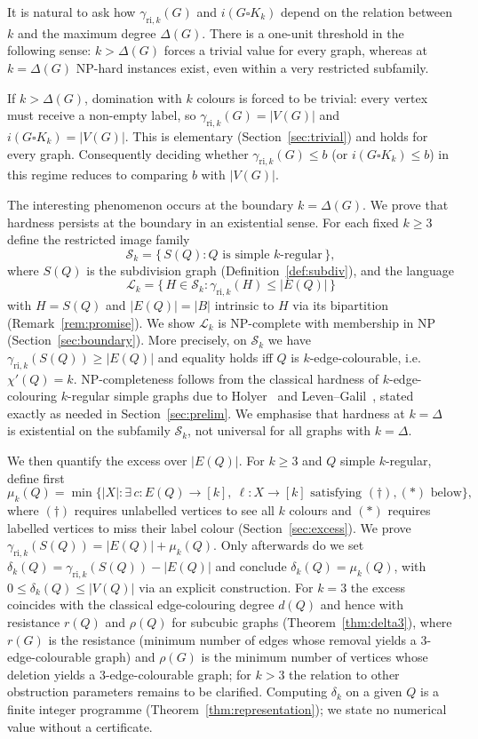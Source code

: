 \documentclass[11pt,a4paper]{article}
\theoremstyle{plain}
\theoremstyle{definition}
\newcommand{\gri}{\gamma_{\mathrm{ri},k}}
\newcommand{\cardK}{\square K_k}
\newcommand{\setK}{[k]}
\newcommand{\cS}{\mathcal{S}}
\newcommand{\cL}{\mathcal{L}}
\begin{document}
It is natural to ask how $\gri(G)$ and $i(G\cardK)$ depend on the relation between $k$ and the maximum degree $\Delta(G)$.
There is a one-unit threshold in the following sense: $k>\Delta(G)$ forces a trivial value for every graph, whereas at $k=\Delta(G)$ NP-hard instances exist, even within a very restricted subfamily.

If $k>\Delta(G)$, domination with $k$ colours is forced to be trivial:
every vertex must receive a non-empty label, so $\gri(G)=|V(G)|$ and $i(G\cardK)=|V(G)|$.
This is elementary (Section~\ref{sec:trivial}) and holds for every graph.
Consequently deciding whether $\gri(G)\le b$ (or $i(G\cardK)\le b$) in this regime reduces to comparing $b$ with $|V(G)|$.

The interesting phenomenon occurs at the boundary $k=\Delta(G)$.
We prove that hardness persists at the boundary in an existential sense.
For each fixed $k\ge3$ define the restricted image family
\[
\cS_{k}=\{\,S(Q): Q\text{ is simple $k$-regular}\,\},
\]
where $S(Q)$ is the subdivision graph (Definition~\ref{def:subdiv}), and the language
\[
\cL_{k}=\{\,H\in\cS_{k}: \gri(H)\le |E(Q)|\,\}
\]
with $H=S(Q)$ and $|E(Q)|=|B|$ intrinsic to $H$ via its bipartition (Remark~\ref{rem:promise}).
We show $\cL_{k}$ is NP-complete with membership in NP (Section~\ref{sec:boundary}).
More precisely, on $\cS_{k}$ we have $\gri(S(Q))\ge|E(Q)|$ and equality holds iff $Q$ is $k$-edge-colourable, i.e.\ $\chi'(Q)=k$.
NP-completeness follows from the classical hardness of $k$-edge-colouring $k$-regular simple graphs due to Holyer~\cite{Holyer1981} and Leven--Galil~\cite{LevenGalil1983}, stated exactly as needed in Section~\ref{sec:prelim}.
We emphasise that hardness at $k=\Delta$ is existential on the subfamily $\cS_{k}$, not universal for all graphs with $k=\Delta$.

We then quantify the excess over $|E(Q)|$.
For $k\ge3$ and $Q$ simple $k$-regular, define first
\[
\mu_{k}(Q)=\min\{|X|: \exists\,c:E(Q)\to\setK,\ \ell:X\to\setK\text{ satisfying }(\dagger),(\ast)\text{ below}\},
\]
where $(\dagger)$ requires unlabelled vertices to see all $k$ colours and $(\ast)$ requires labelled vertices to miss their label colour (Section~\ref{sec:excess}). We prove $\gri(S(Q))=|E(Q)|+\mu_{k}(Q)$. Only afterwards do we set $\delta_{k}(Q)=\gri(S(Q))-|E(Q)|$ and conclude $\delta_{k}(Q)=\mu_{k}(Q)$, with $0\le\delta_{k}(Q)\le|V(Q)|$ via an explicit construction.
For $k=3$ the excess coincides with the classical edge-colouring degree $d(Q)$ and hence with resistance $r(Q)$ and $\rho(Q)$ for subcubic graphs \cite{FMS2022} (Theorem~\ref{thm:delta3}), where $r(G)$ is the resistance (minimum number of edges whose removal yields a $3$-edge-colourable graph) and $\rho(G)$ is the minimum number of vertices whose deletion yields a $3$-edge-colourable graph; for $k>3$ the relation to other obstruction parameters remains to be clarified. Computing $\delta_{k}$ on a given $Q$ is a finite integer programme (Theorem~\ref{thm:representation}); we state no numerical value without a certificate.
\end{document}
